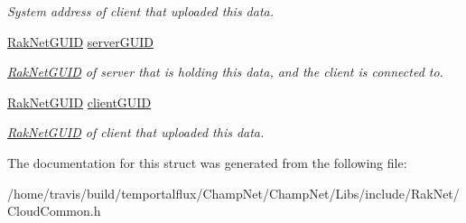 \begin{DoxyCompactItemize}
\begin{DoxyCompactList}\small\item\em System address of client that uploaded this data. \end{DoxyCompactList}\item 
\hypertarget{struct_rak_net_1_1_cloud_query_row_abb316a425db543cac1e1fb532153a3b1}{\hyperlink{struct_rak_net_1_1_rak_net_g_u_i_d}{Rak\-Net\-G\-U\-I\-D} \hyperlink{struct_rak_net_1_1_cloud_query_row_abb316a425db543cac1e1fb532153a3b1}{server\-G\-U\-I\-D}}\label{struct_rak_net_1_1_cloud_query_row_abb316a425db543cac1e1fb532153a3b1}

\begin{DoxyCompactList}\small\item\em \hyperlink{struct_rak_net_1_1_rak_net_g_u_i_d}{Rak\-Net\-G\-U\-I\-D} of server that is holding this data, and the client is connected to. \end{DoxyCompactList}\item 
\hypertarget{struct_rak_net_1_1_cloud_query_row_aafc15763dd932987683c96cb5bd347a2}{\hyperlink{struct_rak_net_1_1_rak_net_g_u_i_d}{Rak\-Net\-G\-U\-I\-D} \hyperlink{struct_rak_net_1_1_cloud_query_row_aafc15763dd932987683c96cb5bd347a2}{client\-G\-U\-I\-D}}\label{struct_rak_net_1_1_cloud_query_row_aafc15763dd932987683c96cb5bd347a2}

\begin{DoxyCompactList}\small\item\em \hyperlink{struct_rak_net_1_1_rak_net_g_u_i_d}{Rak\-Net\-G\-U\-I\-D} of client that uploaded this data. \end{DoxyCompactList}\end{DoxyCompactItemize}


The documentation for this struct was generated from the following file\-:\begin{DoxyCompactItemize}
\item 
/home/travis/build/temportalflux/\-Champ\-Net/\-Champ\-Net/\-Libs/include/\-Rak\-Net/Cloud\-Common.\-h\end{DoxyCompactItemize}

